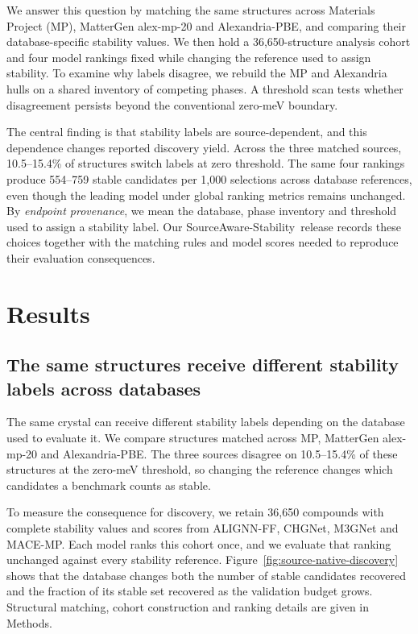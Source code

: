 \documentclass[twoside,twocolumn,9pt]{article}
\newcommand{\sourceaware}{SourceAware-Stability}
\begin{document}
We answer this question by matching the same structures across Materials Project (MP), MatterGen alex-mp-20 and Alexandria-PBE, and comparing their database-specific stability values. We then hold a 36,650-structure analysis cohort and four model rankings fixed while changing the reference used to assign stability. To examine why labels disagree, we rebuild the MP and Alexandria hulls on a shared inventory of competing phases. A threshold scan tests whether disagreement persists beyond the conventional zero-meV boundary.

The central finding is that stability labels are source-dependent, and this dependence changes reported discovery yield. Across the three matched sources, 10.5--15.4\% of structures switch labels at zero threshold. The same four rankings produce 554--759 stable candidates per 1,000 selections across database references, even though the leading model under global ranking metrics remains unchanged. By \emph{endpoint provenance}, we mean the database, phase inventory and threshold used to assign a stability label. Our \sourceaware\ release records these choices together with the matching rules and model scores needed to reproduce their evaluation consequences.

\section{Results}\label{sec:results}

\subsection{The same structures receive different stability labels across databases}\label{subsec:analysis-object}

The same crystal can receive different stability labels depending on the database used to evaluate it. We compare structures matched across MP, MatterGen alex-mp-20 and Alexandria-PBE. The three sources disagree on 10.5--15.4\% of these structures at the zero-meV threshold, so changing the reference changes which candidates a benchmark counts as stable.

To measure the consequence for discovery, we retain 36,650 compounds with complete stability values and scores from ALIGNN-FF, CHGNet, M3GNet and MACE-MP. Each model ranks this cohort once, and we evaluate that ranking unchanged against every stability reference. Figure~\ref{fig:source-native-discovery} shows that the database changes both the number of stable candidates recovered and the fraction of its stable set recovered as the validation budget grows. Structural matching, cohort construction and ranking details are given in Methods.
\end{document}
